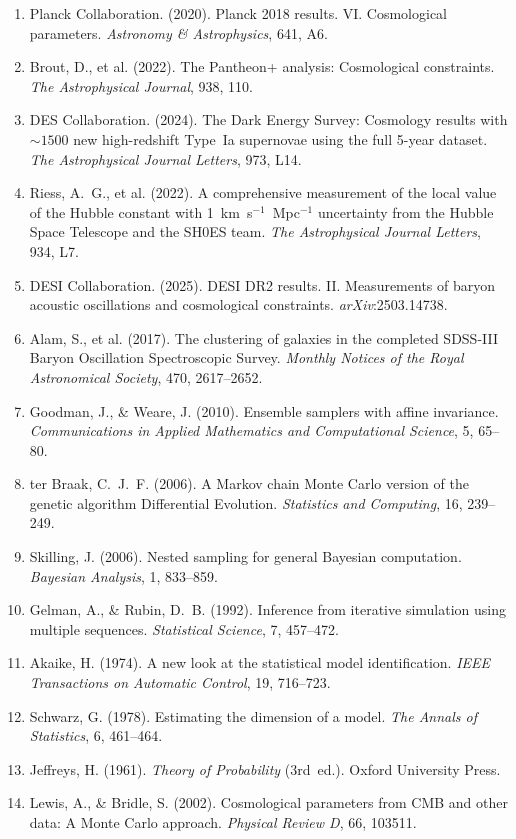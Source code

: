 \documentclass[12pt,letterpaper]{article}
\begin{document}
{\small
\begin{enumerate}[leftmargin=1.8em,itemsep=0.2em]
  \item Planck Collaboration. (2020). Planck 2018 results. VI.
        Cosmological parameters. \textit{Astronomy \& Astrophysics},
        641, A6.
  \item Brout, D., et al. (2022). The Pantheon+ analysis: Cosmological
        constraints. \textit{The Astrophysical Journal}, 938, 110.
  \item DES Collaboration. (2024). The Dark Energy Survey: Cosmology
        results with $\sim 1500$ new high-redshift Type~Ia supernovae
        using the full 5-year dataset. \textit{The Astrophysical Journal
        Letters}, 973, L14.
  \item Riess, A.~G., et al. (2022). A comprehensive measurement of the
        local value of the Hubble constant with 1~km~s$^{-1}$~Mpc$^{-1}$
        uncertainty from the Hubble Space Telescope and the SH0ES team.
        \textit{The Astrophysical Journal Letters}, 934, L7.
  \item DESI Collaboration. (2025). DESI DR2 results. II. Measurements
        of baryon acoustic oscillations and cosmological constraints.
        \textit{arXiv}:2503.14738.
  \item Alam, S., et al. (2017). The clustering of galaxies in the
        completed SDSS-III Baryon Oscillation Spectroscopic Survey.
        \textit{Monthly Notices of the Royal Astronomical Society},
        470, 2617--2652.
  \item Goodman, J., \& Weare, J. (2010). Ensemble samplers with
        affine invariance. \textit{Communications in Applied
        Mathematics and Computational Science}, 5, 65--80.
  \item ter Braak, C.~J.~F. (2006). A Markov chain Monte Carlo version
        of the genetic algorithm Differential Evolution.
        \textit{Statistics and Computing}, 16, 239--249.
  \item Skilling, J. (2006). Nested sampling for general Bayesian
        computation. \textit{Bayesian Analysis}, 1, 833--859.
  \item Gelman, A., \& Rubin, D.~B. (1992). Inference from iterative
        simulation using multiple sequences. \textit{Statistical
        Science}, 7, 457--472.
  \item Akaike, H. (1974). A new look at the statistical model
        identification. \textit{IEEE Transactions on Automatic
        Control}, 19, 716--723.
  \item Schwarz, G. (1978). Estimating the dimension of a model.
        \textit{The Annals of Statistics}, 6, 461--464.
  \item Jeffreys, H. (1961). \textit{Theory of Probability}
        (3rd~ed.). Oxford University Press.
  \item Lewis, A., \& Bridle, S. (2002). Cosmological parameters from
        CMB and other data: A Monte Carlo approach.
        \textit{Physical Review D}, 66, 103511.
\end{enumerate}
}
\end{document}

